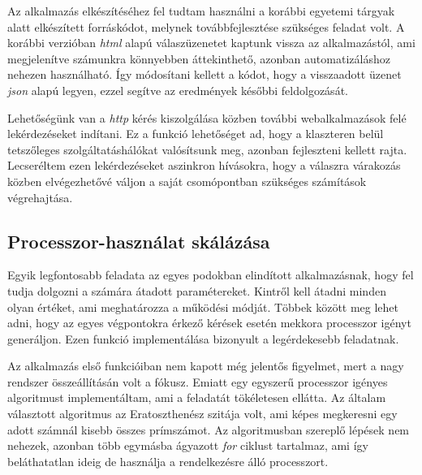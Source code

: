 Az alkalmazás elkészítéséhez fel tudtam használni a korábbi egyetemi tárgyak alatt elkészített forráskódot, melynek továbbfejlesztése szükséges feladat volt.
A korábbi verzióban \textit{html} alapú válaszüzenetet kaptunk vissza az alkalmazástól, ami megjelenítve számunkra könnyebben áttekinthető, azonban automatizáláshoz nehezen használható.
Így módosítani kellett a kódot, hogy a visszaadott üzenet \textit{json} alapú legyen, ezzel segítve az eredmények későbbi feldolgozását.

Lehetőségünk van a \textit{http} kérés kiszolgálása közben további webalkalmazások felé lekérdezéseket indítani.
Ez a funkció lehetőséget ad, hogy a klaszteren belül tetszőleges szolgáltatáshálókat valósítsunk meg, azonban fejleszteni kellett rajta.
Lecseréltem ezen lekérdezéseket aszinkron hívásokra, hogy a válaszra várakozás közben elvégezhetővé váljon a saját csomópontban szükséges számítások végrehajtása. 

\subsection{Processzor-használat skálázása}
Egyik legfontosabb feladata az egyes podokban elindított alkalmazásnak, hogy fel tudja dolgozni a számára átadott paramétereket.
Kintről kell átadni minden olyan értéket, ami meghatározza a működési módját.
Többek között meg lehet adni, hogy az egyes végpontokra érkező kérések esetén mekkora processzor igényt generáljon.
Ezen funkció implementálása bizonyult a legérdekesebb feladatnak.

Az alkalmazás első funkcióiban nem kapott még jelentős figyelmet, mert a nagy rendszer összeállításán volt a fókusz.
Emiatt egy egyszerű processzor igényes algoritmust implementáltam, ami a feladatát tökéletesen ellátta.
Az általam választott algoritmus az Eratoszthenész szitája\citep{sieveOfEratosthenes} volt, ami képes megkeresni egy adott számnál kisebb összes prímszámot.
Az algoritmusban szereplő lépések nem nehezek, azonban több egymásba ágyazott \textit{for} ciklust tartalmaz, ami így beláthatatlan ideig de használja a rendelkezésre álló processzort.

